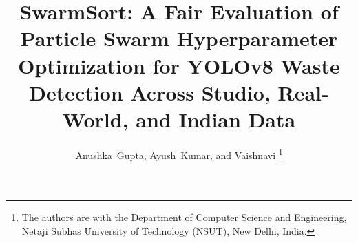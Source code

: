 \documentclass[journal]{IEEEtran}
\begin{document}
\title{SwarmSort: A Fair Evaluation of Particle Swarm Hyperparameter Optimization for YOLOv8 Waste Detection Across Studio, Real-World, and Indian Data}

\author{Anushka~Gupta, Ayush~Kumar, and Vaishnavi%
\thanks{The authors are with the Department of Computer Science and Engineering, Netaji Subhas University of Technology (NSUT), New Delhi, India.}}


\maketitle















\end{document}
